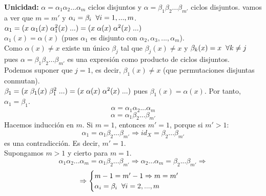 \documentclass[11pt,a4paper]{article}
\begin{document}
\begin{enumerate*}
\item[\textbf{Unicidad:}] $\alpha = \alpha_{1} \alpha_{2} ... \alpha_{m}$ ciclos disjuntos y $\alpha = \beta_{1} \beta_{2} ... \beta_{m'}$ ciclos disjuntos. vamos a ver que $m = m'$ y $\alpha_{i} = \beta_{i} \hspace{0.2cm} \forall i = 1,...,m$. \\
$\alpha_{1} = (x \hspace{0.1cm} \alpha_{1}(x) \hspace{0.1cm} \alpha_{1}^{2}(x) \hspace{0.1cm} ...) = (x \hspace{0.1cm} \alpha(x) \hspace{0.1cm} \alpha^{2}(x) \hspace{0.1cm} ...)$ \\
$\alpha_{1}(x) = \alpha(x)$ (pues $\alpha_{1}$ es disjunto con $\alpha_{2}, \alpha_{3}, ..., \alpha_{m}$). \\
Como $\alpha(x) \neq x$ existe un único $\beta_{j}$ tal que $\beta_{j}(x) \neq x$ y $\beta_{k}(x) = x \hspace{0.2cm} \forall k \neq j$ pues $\alpha = \beta_{1} \beta_{2} ... \beta_{m'}$ es una expresión como producto de ciclos disjuntos. \\
Podemos suponer que $j=1$, es decir, $\beta_{1}(x) \neq x$ (que permutaciones disjuntas conmutan).\\
$\beta_{1} = (x \hspace{0.1cm} \beta_{1}(x) \hspace{0.1cm} \beta_{1}^{2} \hspace{0.1cm} ...) = (x \hspace{0.1cm} \alpha(x) \hspace{0.1cm} \alpha^{2}(x) \hspace{0.1cm} ...)$ pues $\beta_{1}(x) = \alpha(x)$. Por tanto, $\alpha_{1} = \beta_{1}$.
$$\alpha = \alpha_{1} \alpha_{2} ... \alpha_{m}$$
$$\alpha = \alpha_{1} \beta_{2} ... \beta_{m'}$$
Hacemos inducción en $m$. Si $m = 1$, entonces $m' = 1$, porque si $m' > 1$:
$$\alpha_{1} = \alpha_{1} \beta_{2} ... \beta_{m'} \Rightarrow id_{X} = \beta_{2} ... \beta_{m'}$$
es una contradicción. Es decir, $m' = 1$. \\
Supongamos $m > 1$ y cierto para $m = 1$.
\begin{equation*}
\alpha_{1} \alpha_{2} ... \alpha_{m} = \alpha_{1} \beta_{2} ... \beta_{m'} \Rightarrow \alpha_{2} ... \alpha_{m} = \beta_{2} ... \beta_{m'} \Rightarrow 
\end{equation*}
\begin{equation*}
\Rightarrow
\begin{cases}
m-1 = m'-1 \Rightarrow m = m' \\
\alpha_{i} = \beta_{i} \hspace{0.2cm} \forall i = 2,...,m
\end{cases}
\end{equation*}
\end{enumerate*}
\end{document}
